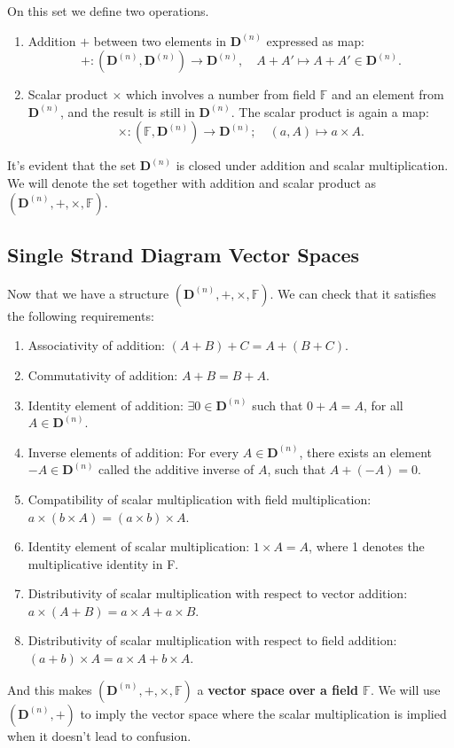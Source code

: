\documentclass[10pt,a4paper]{article}
\begin{document}
	On this set we define two operations. 
	\begin{enumerate}[leftmargin=2\parindent]
	\item Addition $+$ between two elements in $\mathbf D^{(n)}$ expressed as map:
	\begin{equation}
	+: (\mathbf D^{(n)} , \mathbf D^{(n)}) \rightarrow \mathbf D^{(n)},\quad  A+A' \mapsto A+A' \in \mathbf D^{(n)}.
	\end{equation}
	\item Scalar product $ \times$ which involves a number from field $\mathbb F$ and an element from $\mathbf D^{(n)}$, and the result is still in $\mathbf D^{(n)}$. The scalar product is again a map: 
	\begin{equation}
	\times: (\mathbb F , \mathbf D^{(n)}) \rightarrow \mathbf D^{(n)};\quad (a,A)\mapsto a\times A.
	\end{equation}
	\end{enumerate}
	It's evident that the set $\mathbf D^{(n)}$ is closed under addition and scalar multiplication. We will denote the set together with addition and scalar product as $(\mathbf D^{(n)}, +, \times, \mathbb F)$. 
	
	\subsection{Single Strand Diagram Vector Spaces}
	
	Now that we have a structure $(\mathbf D^{(n)}, +, \times, \mathbb F)$. We can check that it satisfies the following requirements:
	\begin{enumerate}[leftmargin=2\parindent]
		\item Associativity of addition: $(A+B)+C = A+(B+C)$.
		\item Commutativity of addition: $A+B=B+A$.
		\item Identity element of addition: $\exists 0 \in \mathbf D^{(n)}$ such that $0+A=A$, for all $A\in \mathbf D^{(n)}$. 
		\item Inverse elements of addition: For every $A\in \mathbf D^{(n)}$, there exists an element $-A\in \mathbf D^{(n)}$ called the additive inverse of $A$, such that $A+(-A)= 0$. 
		\item Compatibility of scalar multiplication with field multiplication:  $a\times (b\times A) = (a\times b)\times A$.
		\item Identity element of scalar multiplication: $1\times A = A$, where 1 denotes the multiplicative identity in F.
		\item Distributivity of scalar multiplication with respect to vector addition: $a\times (A + B) = a\times A + a\times B$.
		\item Distributivity of scalar multiplication with respect to field addition: $(a + b)\times A = a\times A + b\times A$.
	\end{enumerate}
	And this makes $(\mathbf D^{(n)}, +, \times, \mathbb F)$ a \textbf{vector space over a field $\mathbb F$}. We will use $(\mathbf D^{(n)}, +)$ to imply the vector space where the scalar multiplication is implied when it doesn't lead to confusion. 
	
\end{document}
